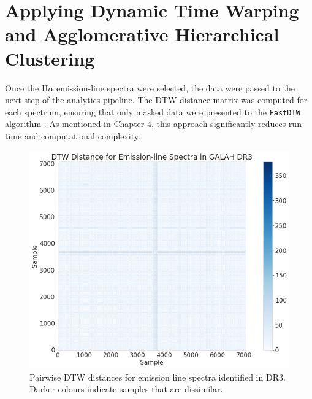 \section{Applying Dynamic Time Warping and Agglomerative Hierarchical Clustering}

Once the H$\alpha$ emission-line spectra were selected, the data were passed to the next step of the analytics pipeline. The DTW distance matrix was computed for each spectrum, ensuring that only masked data were presented to the \texttt{FastDTW} algorithm \citep[the masked region being 6561\r{A} - 6565\r{A};][]{traven2017galah}. As mentioned in Chapter 4, this approach significantly reduces run-time and computational complexity. 

\begin{figure}[!htb]
\centering
\includegraphics[scale=0.50]{figures/dtw distances dr3.png}
\caption{Pairwise DTW distances for emission line spectra identified in DR3. Darker colours indicate samples that are dissimilar.}
\end{figure}

